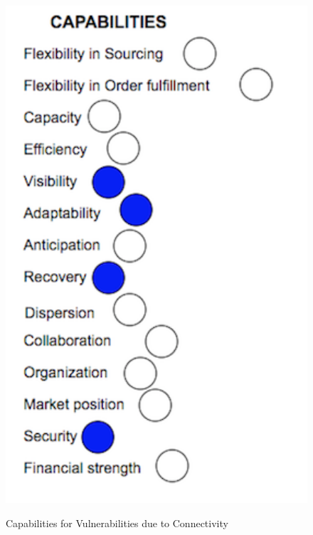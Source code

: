 \begin{figure}[H]
  \centering
  \includegraphics[width=4.5in]{figures/V4.png}\\
  \caption{Capabilities for Vulnerabilities due to Connectivity}\label{V4}
\end{figure}  

